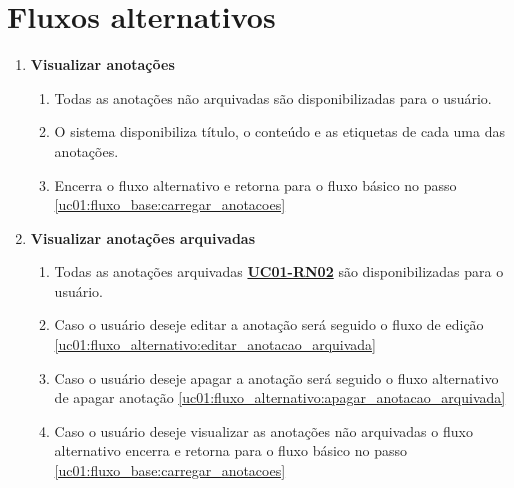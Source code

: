 \documentclass[
	12pt,				%
	oneside,			%
	a4paper,			%
	english,			%
	brazil,				%
	]{abntex2}
\begin{document}
\section{Fluxos alternativos}
\begin{enumerate}[label=\textbf{UC01-FA{\arabic*}},font=\normalsize]
    \subsection{Visualização de anotações}
    
    \item \textbf{\normalsize Visualizar anotações} \label{uc01:fluxo_alternativo:ler_anotacao_nao_arquivada}
    \begin{enumerate}[label={\arabic*}.]
        \item Todas as anotações não arquivadas são disponibilizadas para o usuário.
        \item O sistema disponibiliza título, o conteúdo e as etiquetas de cada uma das anotações.
        \item Encerra o fluxo alternativo e retorna para o fluxo básico no passo \ref{uc01:fluxo_base:carregar_anotacoes}
    \end{enumerate}
    
    \item \textbf{\normalsize Visualizar anotações arquivadas} \label{uc01:fluxo_alternativo:ler_anotacao_arquivada}
    \begin{enumerate}[label={\arabic*}.]
        \item Todas as anotações arquivadas \textbf{\hyperref[uc01:rn02_flag_arquivar]{UC01-RN02}} são disponibilizadas para o usuário.
        \item Caso o usuário deseje editar a anotação será seguido o fluxo de edição \ref{uc01:fluxo_alternativo:editar_anotacao_arquivada}
        \item Caso o usuário deseje apagar a anotação será seguido o fluxo alternativo de apagar anotação \ref{uc01:fluxo_alternativo:apagar_anotacao_arquivada}
        \item Caso o usuário deseje visualizar as anotações não arquivadas o fluxo alternativo encerra e retorna para o fluxo básico no passo \ref{uc01:fluxo_base:carregar_anotacoes}
    \end{enumerate}
    

\end{enumerate}
\end{document}
